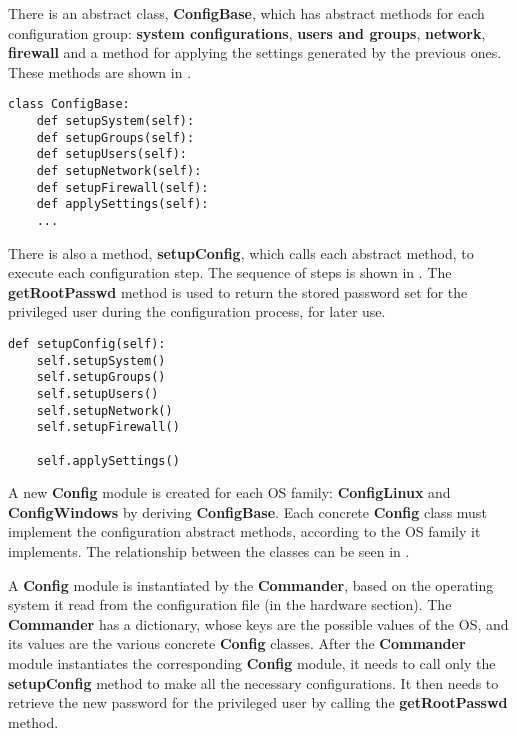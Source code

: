 There is an abstract class, \textbf{ConfigBase}, which has abstract methods for
each configuration group: \textbf{system configurations}, \textbf{users and
groups}, \textbf{network}, \textbf{firewall} and a method for applying the
settings generated by the previous ones. These methods are shown in
.

\lstset{language=Python,caption=ConfigBase methods,label=lst:config-methods}
\begin{lstlisting}
class ConfigBase:
	def setupSystem(self):
	def setupGroups(self):
	def setupUsers(self):
	def setupNetwork(self):
	def setupFirewall(self):
	def applySettings(self):
	...
\end{lstlisting}

There is also a method, \textbf{setupConfig}, which calls each abstract method,
to execute each configuration step. The sequence of steps is shown in
. The \textbf{getRootPasswd} method is
used to return the stored password set for the privileged user during the
configuration process, for later use. 

\lstset{language=Python,caption=Config sequence of steps,label=lst:config-seq}
\begin{lstlisting}
def setupConfig(self):
	self.setupSystem()
	self.setupGroups()
	self.setupUsers()
	self.setupNetwork()
	self.setupFirewall()

	self.applySettings()
\end{lstlisting}

A new \textbf{Config} module is created for each OS family:
\textbf{ConfigLinux} and \textbf{ConfigWindows} by deriving
\textbf{ConfigBase}.  Each concrete \textbf{Config} class must implement the
configuration abstract methods, according to the OS family it implements.  The
relationship between the classes can be seen in .


A \textbf{Config} module is instantiated by the \textbf{Commander}, based on
the operating system it read from the configuration file (in the hardware
section). The \textbf{Commander} has a dictionary, whose keys are the possible
values of the OS, and its values are the various concrete \textbf{Config}
classes. After the \textbf{Commander} module instantiates the corresponding
\textbf{Config} module, it needs to call only the \textbf{setupConfig} method
to make all the necessary configurations. It then needs to retrieve the new
password for the privileged user by calling the \textbf{getRootPasswd} method.


